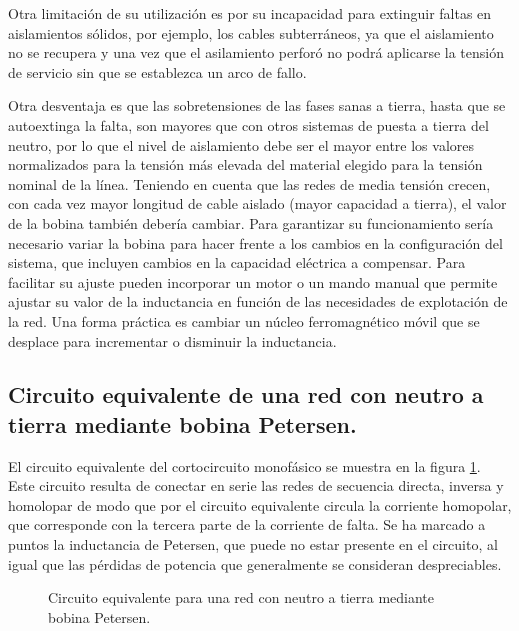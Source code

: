             Otra limitación de su utilización es por su incapacidad para extinguir faltas en aislamientos sólidos, por ejemplo, los cables subterráneos, ya que el aislamiento no se recupera y una vez que el asilamiento perforó no podrá aplicarse la tensión de servicio sin que se establezca un arco de fallo.\newline
            
            Otra desventaja es que las sobretensiones de las fases sanas a tierra, hasta que se autoextinga la falta, son mayores que con otros sistemas de puesta a tierra del neutro, por lo que el nivel de aislamiento debe ser el mayor entre los valores normalizados para la tensión más elevada del material elegido para la tensión nominal de la línea. Teniendo en cuenta que las redes de media tensión crecen, con cada vez mayor longitud de cable aislado (mayor capacidad a tierra), el valor de la bobina también debería cambiar. Para garantizar su funcionamiento sería necesario variar la bobina para hacer frente a los cambios en la configuración del sistema, que incluyen cambios en la capacidad eléctrica a compensar. Para facilitar su ajuste pueden incorporar un motor o un mando manual que permite ajustar su valor de la inductancia en función de las necesidades de explotación de la red. Una forma práctica es cambiar un núcleo ferromagnético móvil que se desplace para incrementar o disminuir la inductancia.

        \subsection{Circuito equivalente de una red con neutro a tierra mediante bobina Petersen.}
            El circuito equivalente del cortocircuito monofásico se muestra en la figura \ref{fig:ctoEq}. Este circuito resulta de conectar en serie las redes de secuencia directa, inversa y homolopar de modo que por el circuito equivalente circula la corriente homopolar, que corresponde con la tercera parte de la corriente de falta. Se ha marcado a puntos la inductancia de Petersen, que puede no estar presente en el circuito, al igual que las pérdidas de potencia que generalmente se consideran despreciables.
            \begin{figure}[H]
                \centering
                \caption{Circuito equivalente para una red con neutro a tierra mediante bobina Petersen.}
                \label{fig:ctoEq}
            \end{figure}